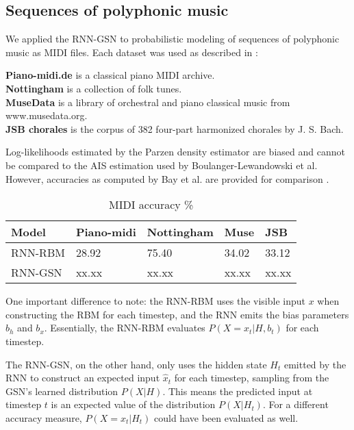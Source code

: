 \subsection{Sequences of polyphonic music}
	We applied the RNN-GSN to probabilistic modeling of sequences of polyphonic music as MIDI files. Each dataset was used as described in \cite{rnnrbm}:

\textbf{Piano-midi.de} is a classical piano MIDI archive.\\
\textbf{Nottingham} is a collection of folk tunes.\\
\textbf{MuseData} is a library of orchestral and piano classical music from www.musedata.org.\\
\textbf{JSB chorales} is the corpus of 382 four-part harmonized chorales by J. S. Bach.
	
Log-likelihoods estimated by the Parzen density estimator are biased and cannot be compared to the AIS estimation used by Boulanger-Lewandowski et al. However, accuracies as computed by Bay et al. are provided for comparison \cite{bay}.

\begin {table}[H]
 \caption {MIDI accuracy \%} \label{tab:midi}
\begin{tabular}{l | l l l l}
\hline
Model & Piano-midi & Nottingham & Muse & JSB\\
\hline
RNN-RBM & 28.92 & 75.40 & 34.02 & 33.12\\
RNN-GSN  & xx.xx  & xx.xx  & xx.xx  & xx.xx\\
\hline
\end{tabular}
\end{table}

One important difference to note: the RNN-RBM uses the visible input $x$ when constructing the RBM for each timestep, and the RNN emits the bias parameters $b_h$ and $b_x$. Essentially, the RNN-RBM evaluates $P(X=x_t|H,b_t)$ for each timestep.

The RNN-GSN, on the other hand, only uses the hidden state $H_t$ emitted by the RNN to construct an expected input $\hat{x}_t$ for each timestep, sampling from the GSN's learned distribution $P(X|H)$. This means the predicted input at timestep $t$ is an expected value of the distribution $P(X|H_t)$. For a different accuracy measure, $P(X=x_t|H_t)$ could have been evaluated as well.